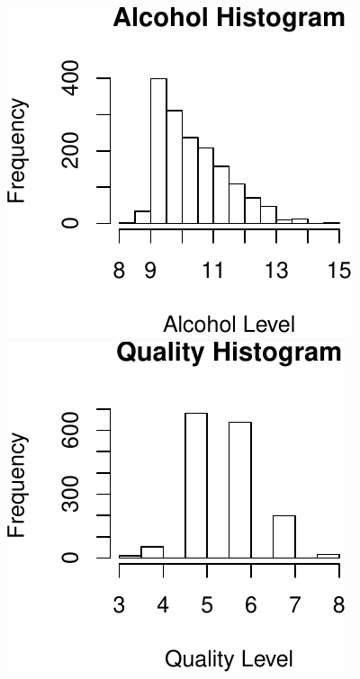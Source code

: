 \documentclass[]{article}
\begin{document}
\includegraphics{./Project_files/figure-latex/unnamed-chunk-18-10.pdf}
\includegraphics{./Project_files/figure-latex/unnamed-chunk-18-11.pdf}
\end{document}
